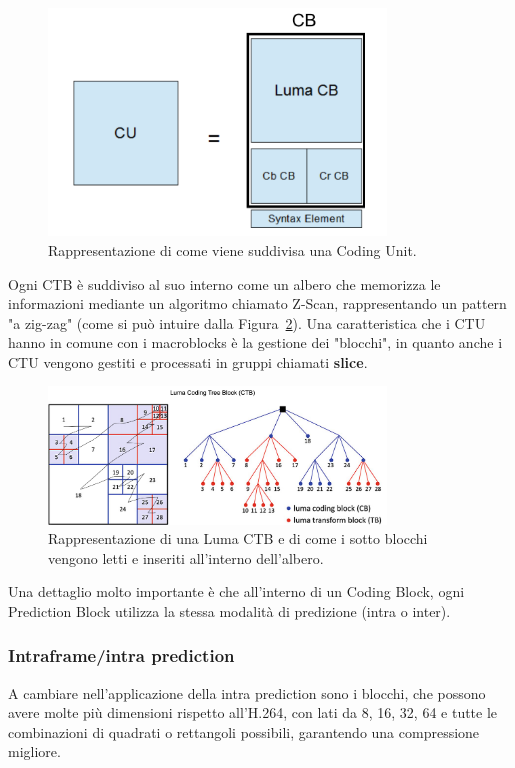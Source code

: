\documentclass[a4paper,12pt, oneside]{article}
\begin{document}
 \begin{figure}[h]
    \centering
    \includegraphics[width=0.8\textwidth]{images/coding-unit.png}
    \caption{Rappresentazione di come viene suddivisa una Coding Unit.}
    \label{fig:coding_unit}
\end{figure}

 \noindent Ogni CTB è suddiviso al suo interno come un albero che memorizza le informazioni mediante un algoritmo
chiamato Z-Scan, rappresentando un pattern "a zig-zag" (come si può intuire dalla
Figura~\ref{fig:chroma_CTB}).
Una caratteristica che i CTU hanno in comune con i macroblocks è la gestione dei "blocchi",
in quanto anche i CTU vengono gestiti e processati in gruppi chiamati \textbf{slice}.

\begin{figure}[h]
    \centering
    \includegraphics[width=0.8\textwidth]{images/chroma-CTB.png}
    \caption{Rappresentazione di una Luma CTB e di come i sotto blocchi vengono letti e inseriti
    all'interno dell'albero.}
    \label{fig:chroma_CTB}
\end{figure}

Una dettaglio molto importante è che all'interno di un Coding Block, ogni Prediction Block utilizza la
stessa modalità di predizione (intra o inter).

\subsubsection{Intraframe/intra prediction}
A cambiare nell'applicazione della intra prediction sono i blocchi, che possono avere molte più
dimensioni rispetto all'H.264, con lati da 8, 16, 32, 64 e tutte le combinazioni di quadrati o rettangoli
possibili, garantendo una compressione migliore.
\end{document}
